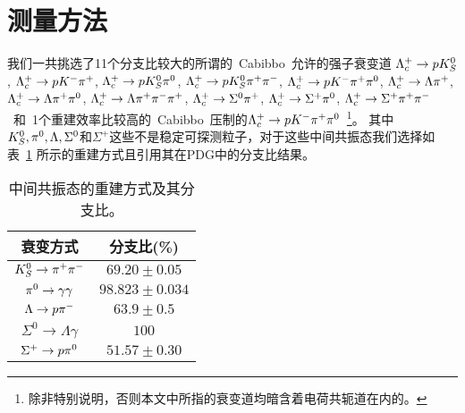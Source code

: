 \section{测量方法}
\label{sec:method}
我们一共挑选了11个分支比较大的所谓的~Cabibbo~允许的强子衰变道
$\Lmodea$, $\Lmodeb$, $\Lmodec$, $\Lmoded$, $\Lmodee$, $\Lmodeaa$, $\Lmodebb$, $\Lmodedd$, $\Lmodeaaa$, $\Lmodeccc$, $\Lmodeddd$~和~1个重建效率比较高的~Cabibbo~压制的$\Lmodee$~\footnote{除非特别说明，否则本文中所指的衰变道均暗含着电荷共轭道在内的。}。
其中$\Ks,\pizero,\Lambda,\Sigma^0$和$\Sigma^+$这些不是稳定可探测粒子，对于这些中间共振态我们选择如表~\ref{tab:interDecay} 所示的重建方式且引用其在PDG中的分支比结果。

\begin{table}
\caption{中间共振态的重建方式及其分支比。}
\centering
\begin{tabular}{c|c}
\hline \hline
衰变方式 &分支比(\%) \\ \hline
$\Ks \to \pip\pim$  &    $69.20\pm 0.05$   \\ 
$\pizero \to \gamma\gamma$       &   $98.823\pm 0.034$    \\
$\Lambda \to p\pim$       &   $63.9\pm 0.5$    \\
$\Sigma^0 \to \Lambda\gamma$       &   $100$    \\
$\Sigma^+ \to p\pizero$       &   $51.57\pm 0.30$    \\
\hline
\end{tabular}
\label{tab:interDecay}
\end{table}

